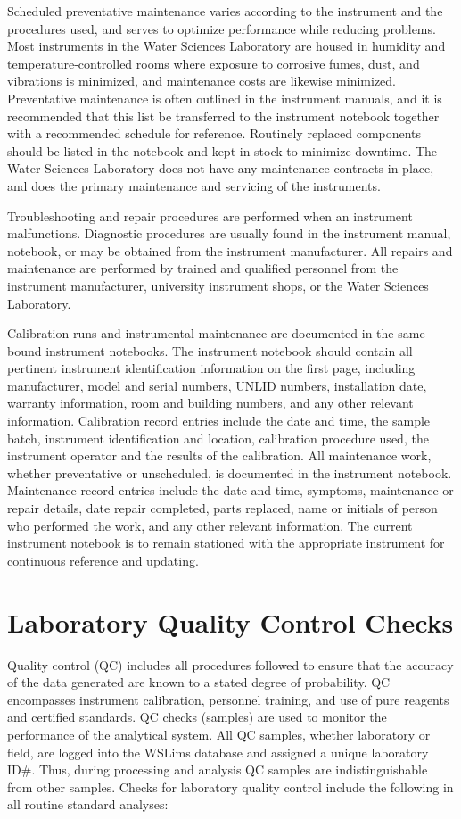 Scheduled preventative maintenance varies according to the instrument 
and the procedures used, and serves to optimize performance while 
reducing problems. Most instruments in the Water Sciences Laboratory are 
housed in humidity and temperature-controlled rooms where exposure to 
corrosive fumes, dust, and vibrations is minimized, and maintenance 
costs are likewise minimized. Preventative maintenance is often outlined 
in the instrument manuals, and it is recommended that this list be 
transferred to the instrument notebook together with a recommended 
schedule for reference. Routinely replaced components should be listed 
in the notebook and kept in stock to minimize downtime. The Water 
Sciences Laboratory does not have any maintenance contracts in place, 
and does the primary maintenance and servicing of the instruments. 

Troubleshooting and repair procedures are performed when an instrument 
malfunctions. Diagnostic procedures are usually found in the instrument 
manual, notebook, or may be obtained from the instrument manufacturer. 
All repairs and maintenance are performed by trained and qualified 
personnel from the instrument manufacturer, university instrument shops, 
or the Water Sciences Laboratory. 

Calibration runs and instrumental maintenance are documented in 
the same bound instrument notebooks. The instrument notebook should 
contain all pertinent instrument identification information on the first 
page, including manufacturer, model and serial numbers, UNLID numbers, 
installation date, warranty information, room and building numbers, and 
any other relevant information. Calibration record entries include the 
date and time, the sample batch, instrument identification and location, 
calibration procedure used, the instrument operator and the results of 
the calibration. All maintenance work, whether preventative or 
unscheduled, is documented in the instrument notebook. Maintenance 
record entries include the date and time, symptoms, maintenance or 
repair details, date repair completed, parts replaced, name or initials 
of person who performed the work, and any other relevant information. 
The current instrument notebook is to remain stationed with the 
appropriate instrument for continuous reference and updating. 



\section{Laboratory Quality Control Checks}
Quality control (QC) includes all procedures followed to ensure 
that the accuracy of the data generated are known to a stated degree of 
probability. QC encompasses instrument calibration, personnel training, 
and use of pure reagents and certified standards. QC checks (samples) 
are used to monitor the performance of the analytical system. All QC 
samples, whether laboratory or field, are logged into the WSLims 
database and assigned a unique laboratory ID\#. Thus, during processing 
and analysis QC samples are indistinguishable from other samples. Checks 
for laboratory quality control include the following in all routine 
standard analyses:


